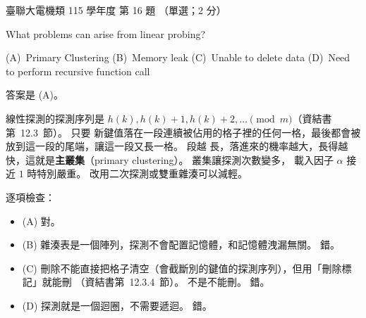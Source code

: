 \begin{pastexam}[label={px:ust-115-ee-ds-16}]{臺聯大電機類 115 學年度 第 16 題}
（單選；2 分）

What problems can arise from linear probing?

(A)~Primary Clustering \qquad (B)~Memory leak \qquad (C)~Unable to delete data \qquad
(D)~Need to perform recursive function call
\end{pastexam}

\begin{pastsoln}
答案是 (A)。

線性探測的探測序列是 $h(k), h(k) + 1, h(k) + 2, \ldots \pmod m$（資結書第~12.3~節）。 只要
新鍵值落在一段連續被佔用的格子裡的任何一格，最後都會被放到這一段的尾端，讓這一段又長一格。 段越
長，落進來的機率越大，長得越快，這就是\textbf{主叢集}（primary clustering）。 叢集讓探測次數變多，
載入因子 $\alpha$ 接近 $1$ 時特別嚴重。 改用二次探測或雙重雜湊可以減輕。

逐項檢查：
\begin{itemize}
\item (A) 對。
\item (B) 雜湊表是一個陣列，探測不會配置記憶體，和記憶體洩漏無關。 錯。
\item (C) 刪除不能直接把格子清空（會截斷別的鍵值的探測序列），但用「刪除標記」就能刪
（資結書第~12.3.4~節）。 不是不能刪。 錯。
\item (D) 探測就是一個迴圈，不需要遞迴。 錯。
\end{itemize}
\end{pastsoln}
